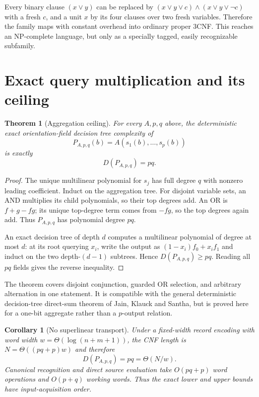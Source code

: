 \documentclass[11pt]{article}
\newtheorem{theorem}{Theorem}
\newtheorem{corollary}{Corollary}
\begin{document}
Every binary clause $(x\lor y)$ can be replaced by
$(x\lor y\lor c)\wedge(x\lor y\lor\neg c)$ with a fresh $c$, and a unit $x$
by its four clauses over two fresh variables.  Therefore the family maps with
constant overhead into ordinary proper 3CNF.  This reaches an NP-complete
language, but only as a specially tagged, easily recognizable subfamily.

\section{Exact query multiplication and its ceiling}
\begin{theorem}[Aggregation ceiling]
For every $A,p,q$ above, the deterministic exact orientation-field decision
tree complexity of
\[
P_{A,p,q}(b)=A(s_1(b),\ldots,s_p(b))
\]
is exactly
\[
D(P_{A,p,q})=pq.
\]
\end{theorem}
\begin{proof}
The unique multilinear polynomial for $s_j$ has full degree $q$ with nonzero
leading coefficient.  Induct on the aggregation tree.  For disjoint variable
sets, an AND multiplies its child polynomials, so their top degrees add.  An OR
is $f+g-fg$; its unique top-degree term comes from $-fg$, so the top degrees
again add.  Thus $P_{A,p,q}$ has polynomial degree $pq$.

An exact decision tree of depth $d$ computes a multilinear polynomial of degree
at most $d$: at its root querying $x_i$, write the output as
$(1-x_i)f_0+x_if_1$ and induct on the two depth-$(d-1)$ subtrees.  Hence
$D(P_{A,p,q})\ge pq$.  Reading all $pq$ fields gives the reverse inequality.
\end{proof}

The theorem covers disjoint conjunction, guarded OR selection, and arbitrary
alternation in one statement.  It is compatible with the general deterministic
decision-tree direct-sum theorem of Jain, Klauck and Santha, but is proved here
for a one-bit aggregate rather than a $p$-output relation.

\begin{corollary}[No superlinear transport]
Under a fixed-width record encoding with word width
$w=\Theta(\log(n+m+1))$, the CNF length is
$N=\Theta((pq+p)w)$ and therefore
\[
D(P_{A,p,q})=pq=\Theta(N/w).
\]
Canonical recognition and direct source evaluation take $O(pq+p)$ word
operations and $O(p+q)$ working words.  Thus the exact lower and upper bounds
have input-acquisition order.
\end{corollary}
\end{document}
